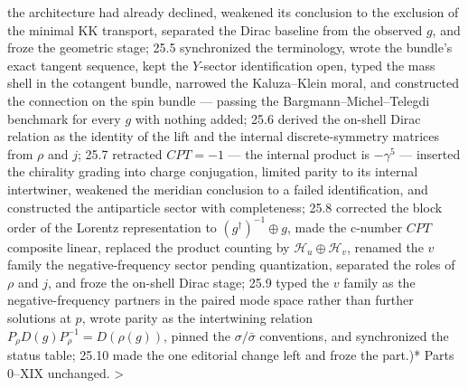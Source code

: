 the architecture had already declined, weakened its conclusion to the exclusion of the minimal KK transport, separated the Dirac baseline from the observed $g$, and froze the geometric stage; 25.5 synchronized the terminology, wrote the bundle's exact tangent sequence, kept the $Y$-sector identification open, typed the mass shell in the cotangent bundle, narrowed the Kaluza–Klein moral, and constructed the connection on the spin bundle — passing the Bargmann–Michel–Telegdi benchmark for every $g$ with nothing added; 25.6 derived the on-shell Dirac relation as the identity of the lift and the internal discrete-symmetry matrices from $\rho$ and $j$; 25.7 retracted $CPT = -1$ — the internal product is $-\gamma^5$ — inserted the chirality grading into charge conjugation, limited parity to its internal intertwiner, weakened the meridian conclusion to a failed identification, and constructed the antiparticle sector with completeness; 25.8 corrected the block order of the Lorentz representation to $(g^\dagger)^{-1}\oplus g$, made the c-number $CPT$ composite linear, replaced the product counting by $\mathcal H_u\oplus\mathcal H_v$, renamed the $v$ family the negative-frequency sector pending quantization, separated the roles of $\rho$ and $j$, and froze the on-shell Dirac stage; 25.9 typed the $v$ family as the negative-frequency partners in the paired mode space rather than further solutions at $p$, wrote parity as the intertwining relation $P_\rho D(g)P_\rho^{-1} = D(\rho(g))$, pinned the $\sigma/\bar\sigma$ conventions, and synchronized the status table; 25.10 made the one editorial change left and froze the part.)* Parts 0–XIX unchanged.
>
